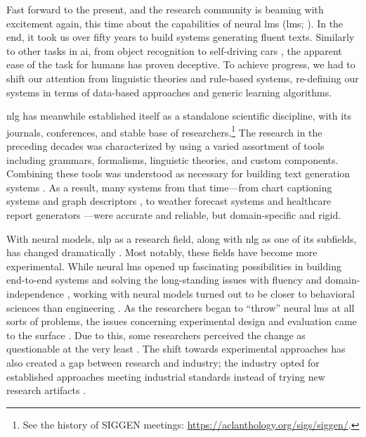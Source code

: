 Fast forward to the present, and the research community is beaming with excitement again, this time about the capabilities of neural \aclp{lm} (\acsp{lm}; \citealp{radford2019language,brown2020language}). In the end, it took us over fifty years to build systems generating fluent texts. Similarly to other tasks in \ac{ai}, from object recognition \cite{papert1966summer} to self-driving cars \cite{autonomouscars}, the apparent ease of the task for humans has proven deceptive.  To achieve progress, we had to shift our attention from linguistic theories and rule-based systems, re-defining our systems in terms of data-based approaches and generic learning algorithms.

\Ac{nlg} has meanwhile established itself as a standalone scientific discipline, with its journals, conferences, and stable base of researchers.\footnote{See the history of SIGGEN meetings: \url{https://aclanthology.org/sigs/siggen/}.} The research in the preceding decades was characterized by using a varied assortment of tools including grammars, formalisms, linguistic theories, and custom components. Combining these tools was understood as necessary for building text generation systems \cite{mann-1982-text,reiterBuildingAppliedNatural1997}. As a result, many systems from that time---from chart captioning systems \cite{mittalDescribingComplexCharts1998} and graph descriptors \cite{sunDomainIndependentSentence2006}, to weather forecast systems \cite{belzAutomaticGenerationWeather2008} and healthcare report generators \cite{portetAutomaticGenerationTextual2009}---were accurate and reliable, but domain-specific and rigid.


With neural models, \ac{nlp} as a research field, along with \ac{nlg} as one of its subfields, has changed dramatically \cite{gururaja2023build,li2023defining}. Most notably, these fields have become more experimental. While neural \acp{lm} opened up fascinating possibilities in building end-to-end systems and solving the long-standing issues with fluency and domain-independence \cite{ferreiraNeuralDatatotextGeneration2019,dusekEvaluatingStateoftheartEndtoEnd2020,sharmaInnovationsNeuralDatatotext2022}, working with neural models turned out to be closer to behavioral sciences than engineering \cite{holtzmanGenerativeModelsComplex2023}. As the researchers began to ``throw'' neural \acp{lm} at all sorts of problems, the issues concerning experimental design and evaluation came to the surface \cite{gehrmannRepairingCrackedFoundation2022}. Due to this, some researchers perceived the change as questionable at the very least \cite{reiter2020academic,gururaja2023build,michael2023nlp}. The shift towards experimental approaches has also created a gap between research and industry; the industry opted for established approaches meeting industrial standards instead of trying new research artifacts \cite{daleNaturalLanguageGeneration2020,daleNavigatingTextGeneration2023}.


